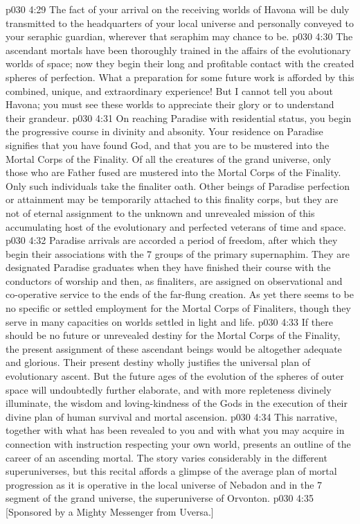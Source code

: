 \vs p030 4:29 The fact of your arrival on the receiving worlds of Havona will be duly transmitted to the headquarters of your local universe and personally conveyed to your seraphic guardian, wherever that seraphim may chance to be.
\vs p030 4:30 The ascendant mortals have been thoroughly trained in the affairs of the evolutionary worlds of space; now they begin their long and profitable contact with the created spheres of perfection. What a preparation for some future work is afforded by this combined, unique, and extraordinary experience! But I cannot tell you about Havona; you must see these worlds to appreciate their glory or to understand their grandeur.
\vs p030 4:31 \bibnobreakspace {} On reaching Paradise with residential status, you begin the progressive course in divinity and absonity. Your residence on Paradise signifies that you have found God, and that you are to be mustered into the Mortal Corps of the Finality. Of all the creatures of the grand universe, only those who are Father fused are mustered into the Mortal Corps of the Finality. Only such individuals take the finaliter oath. Other beings of Paradise perfection or attainment may be temporarily attached to this finality corps, but they are not of eternal assignment to the unknown and unrevealed mission of this accumulating host of the evolutionary and perfected veterans of time and space.
\vs p030 4:32 Paradise arrivals are accorded a period of freedom, after which they begin their associations with the 7 groups of the primary supernaphim. They are designated Paradise graduates when they have finished their course with the conductors of worship and then, as finaliters, are assigned on observational and co\hyp{}operative service to the ends of the far\hyp{}flung creation. As yet there seems to be no specific or settled employment for the Mortal Corps of Finaliters, though they serve in many capacities on worlds settled in light and life.
\vs p030 4:33 If there should be no future or unrevealed destiny for the Mortal Corps of the Finality, the present assignment of these ascendant beings would be altogether adequate and glorious. Their present destiny wholly justifies the universal plan of evolutionary ascent. But the future ages of the evolution of the spheres of outer space will undoubtedly further elaborate, and with more repleteness divinely illuminate, the wisdom and loving\hyp{}kindness of the Gods in the execution of their divine plan of human survival and mortal ascension.
\vs p030 4:34 \pc This narrative, together with what has been revealed to you and with what you may acquire in connection with instruction respecting your own world, presents an outline of the career of an ascending mortal. The story varies considerably in the different superuniverses, but this recital affords a glimpse of the average plan of mortal progression as it is operative in the local universe of Nebadon and in the 7 segment of the grand universe, the superuniverse of Orvonton.
\vsetoff
\vs p030 4:35 [Sponsored by a Mighty Messenger from Uversa.]
